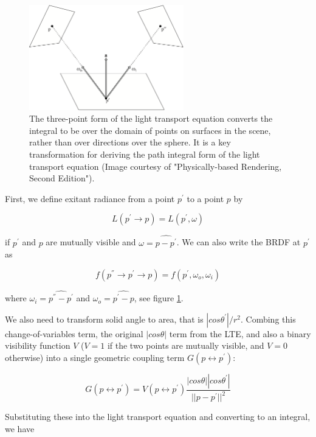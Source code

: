 \begin{figure}\label{f:three-point-form}
	\sidecaption
	\includegraphics[width=0.6\textwidth]{graphics/gi/path-4}
	\caption{The three-point form of the light transport equation converts the integral to be over the domain of points on surfaces in the scene, rather than over directions over the sphere. It is a key transformation for deriving the path integral form of the light transport equation (Image courtesy of "Physically-based Rendering, Second Edition").}
\end{figure}

First, we define exitant radiance from a point $p^{'}$ to a point $p$ by

\begin{equation*}
	L(p^{'}\to p)=L(p^{'},\omega)
\end{equation*}

if $p^{'}$ and $p$ are mutually visible and $\omega=\widehat{p-p^{'}}$. We can also write the BRDF at $p^{'}$ as 

\begin{equation*}
	f(p^{''}\to p^{'}\to p)=f(p^{'},\omega_o,\omega_i)
\end{equation*}

where $\omega_i=\widehat{p^{''}-p^{'}}$ and $\omega_o=\widehat{p^{'}-p}$, see figure \ref{f:three-point-form}.

We also need to transform solid angle to area, that is $|cos\theta^{'}|/r^2$. Combing this change-of-variables term, the original $|cos\theta|$ term from the LTE, and also a binary visibility function $V$ ($V=1$ if the two points are mutually visible, and $V=0$ otherwise) into a single geometric coupling term $G(p\leftrightarrow p^{'})$:

\begin{equation*}
	G(p\leftrightarrow p^{'})=V(p\leftrightarrow p^{'})\frac{|cos\theta||cos\theta^{'}|}{||p-p^{'}||^2}
\end{equation*} 

Substituting these into the light transport equation and converting to an integral, we have

